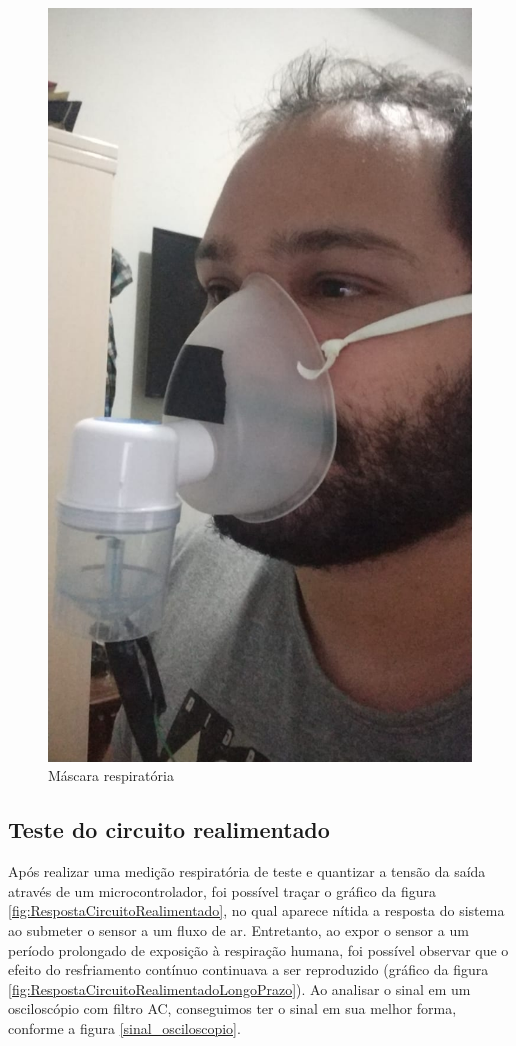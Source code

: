\begin{figure}[h!]
	\begin{center}
		\includegraphics[width=0.8\linewidth]{images/mascara3.jpeg}
		\caption{Máscara respiratória}
		\label{fig:mascara3}
	\end{center}
\end{figure}
\FloatBarrier

\subsection{Teste do circuito realimentado}

Após realizar uma medição respiratória de teste e quantizar a tensão da saída através de um microcontrolador, foi possível traçar o gráfico da figura \ref{fig:RespostaCircuitoRealimentado}, no qual aparece nítida a resposta do sistema ao submeter o sensor a um fluxo de ar. Entretanto, ao expor o sensor a um período prolongado de exposição à respiração humana, foi possível observar que o efeito do resfriamento contínuo continuava a ser reproduzido (gráfico da figura \ref{fig:RespostaCircuitoRealimentadoLongoPrazo}). Ao analisar o sinal em um osciloscópio com filtro AC, conseguimos ter o sinal em sua melhor forma, conforme a figura \ref{sinal_osciloscopio}.


